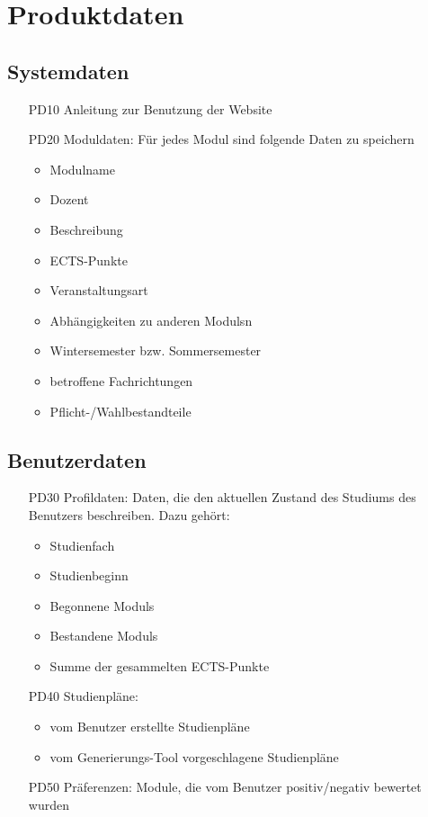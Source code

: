 \section{Produktdaten}

\subsection{Systemdaten}
	
\begin{itemize}[nosep]
	\item[PD10]Anleitung zur Benutzung der Website
	\item[PD20] \gls{Modul}daten: Für jedes \gls{Modul} sind folgende Daten zu speichern	
	\begin{itemize}
		\item Modulname
		\item Dozent
		\item Beschreibung
		\item \gls{ECTS-Punkte}
		\item Veranstaltungsart
		\item Abhängigkeiten zu anderen \glspl{Modul}n
		\item Wintersemester bzw. Sommersemester
		\item betroffene Fachrichtungen 
		\item Pflicht-/Wahlbestandteile
	\end{itemize}	 
\end{itemize}

\subsection{Benutzerdaten}
\label{subsec:product_data-benutzerdaten}  %

\begin{itemize}[nosep]
	\item[PD30]Profildaten: Daten, die den aktuellen Zustand des Studiums des Benutzers beschreiben. Dazu gehört: 
	\begin{itemize}
		\item Studienfach
		\item Studienbeginn
		\item Begonnene \glspl{Modul}
		\item Bestandene \glspl{Modul} 
		\item Summe der gesammelten \gls{ECTS-Punkte}
	\end{itemize}
	\item[PD40] Studienpläne:
	\begin{itemize}
		\item 	vom Benutzer erstellte Studienpläne 
		\item	vom \gls{Generierungs-Tool} vorgeschlagene Studienpläne 
	\end{itemize} 
	\item[PD50] Präferenzen: Module, die vom Benutzer positiv/negativ bewertet wurden
\end{itemize}